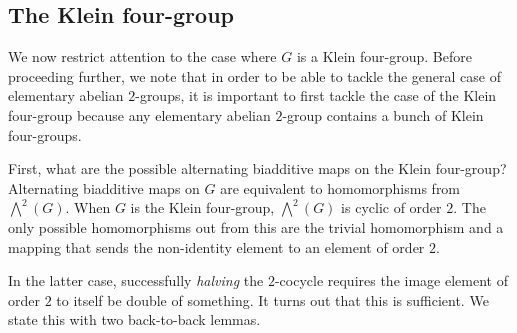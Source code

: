 \documentclass[10pt]{amsart}
\begin{document}
\subsection{The Klein four-group}

We now restrict attention to the case where $G$ is a Klein
four-group. Before proceeding further, we note that in order to be
able to tackle the general case of elementary abelian $2$-groups, it
is important to first tackle the case of the Klein four-group because
any elementary abelian $2$-group contains a bunch of Klein
four-groups.

First, what are the possible alternating biadditive maps on the Klein
four-group? Alternating biadditive maps on $G$ are equivalent to
homomorphisms from $\bigwedge^2(G)$. When $G$ is the Klein four-group,
$\bigwedge^2(G)$ is cyclic of order $2$. The only possible
homomorphisms out from this are the trivial homomorphism and a mapping
that sends the non-identity element to an element of order $2$.

In the latter case, successfully {\em halving} the $2$-cocycle
requires the image element of order $2$ to itself be double of
something. It turns out that this is sufficient. We state this with
two back-to-back lemmas.
\end{document}
